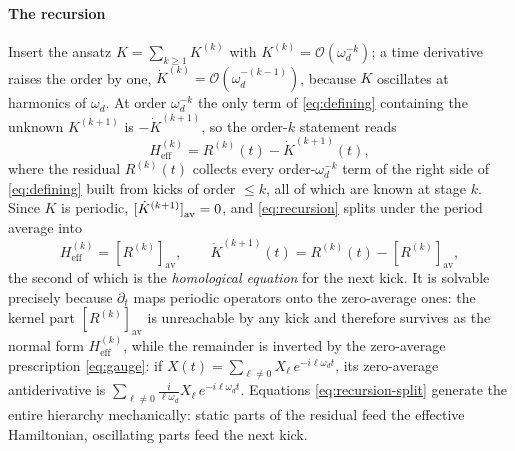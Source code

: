 \documentclass[a4paper,11pt]{article}
\newcommand{\av}[1]{\left[#1\right]_{\mathrm{av}}}
\newcommand{\eff}{\mathrm{eff}}
\begin{document}
\paragraph{The recursion}
Insert the ansatz $K = \sum_{k\ge1}K^{(k)}$ with $K^{(k)} = \mathcal O(\omega_d^{-k})$; a time derivative raises the order by one, $\dot K^{(k)} = \mathcal O(\omega_d^{-(k-1)})$, because $K$ oscillates at harmonics of $\omega_d$. At order $\omega_d^{-k}$ the only term of \cref{eq:defining} containing the unknown $K^{(k+1)}$ is $-\dot K^{(k+1)}$, so the order-$k$ statement reads
\begin{equation}\label{eq:recursion}
  H_\eff^{(k)} = R^{(k)}(t) - \dot K^{(k+1)}(t),
\end{equation}
where the residual $R^{(k)}(t)$ collects every order-$\omega_d^{-k}$ term of the right side of \cref{eq:defining} built from kicks of order $\le k$, all of which are known at stage $k$. Since $K$ is periodic, $\av{\smash{\dot K^{(k+1)}}} = 0$, and \cref{eq:recursion} splits under the period average into
\begin{equation}\label{eq:recursion-split}
  H_\eff^{(k)} = \av{R^{(k)}},
  \qquad
  \dot K^{(k+1)}(t) = R^{(k)}(t) - \av{R^{(k)}},
\end{equation}
the second of which is the \emph{homological equation} for the next kick. It is solvable precisely because $\partial_t$ maps periodic operators onto the zero-average ones: the kernel part $\av{R^{(k)}}$ is unreachable by any kick and therefore survives as the normal form $H_\eff^{(k)}$, while the remainder is inverted by the zero-average prescription \eqref{eq:gauge}: if $X(t) = \sum_{\ell\neq0}X_\ell\, e^{-i\ell\omega_d t}$, its zero-average antiderivative is $\sum_{\ell\neq0}\frac{i}{\ell\omega_d}X_\ell\, e^{-i\ell\omega_d t}$. Equations \eqref{eq:recursion-split} generate the entire hierarchy mechanically: static parts of the residual feed the effective Hamiltonian, oscillating parts feed the next kick.
\end{document}
